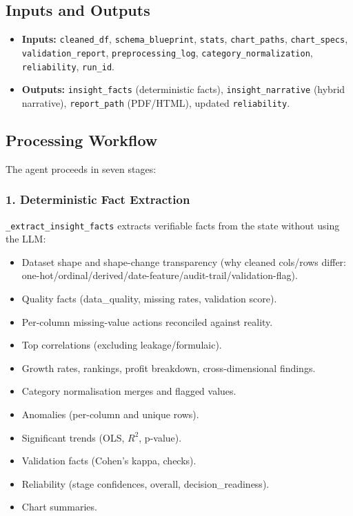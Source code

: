 \documentclass[12pt,a4paper,openany]{report}
\begin{document}
\subsection{Inputs and Outputs}
\begin{itemize}
	\item \textbf{Inputs:} \texttt{cleaned\_df}, \texttt{schema\_blueprint}, \texttt{stats}, \texttt{chart\_paths}, \texttt{chart\_specs}, \texttt{validation\_report}, \texttt{preprocessing\_log}, \texttt{category\_normalization}, \texttt{reliability}, \texttt{run\_id}.
	\item \textbf{Outputs:} \texttt{insight\_facts} (deterministic facts), \texttt{insight\_narrative} (hybrid narrative), \texttt{report\_path} (PDF/HTML), updated \texttt{reliability}.
\end{itemize}

\subsection{Processing Workflow}
The agent proceeds in seven stages:

\subsubsection{1. Deterministic Fact Extraction}
\texttt{\_extract\_insight\_facts} extracts verifiable facts from the state without using the LLM:
\begin{itemize}
	\item Dataset shape and shape-change transparency (why cleaned cols/rows differ: one-hot/ordinal/derived/date-feature/audit-trail/validation-flag).
	\item Quality facts (data\_quality, missing rates, validation score).
	\item Per-column missing-value actions reconciled against reality.
	\item Top correlations (excluding leakage/formulaic).
	\item Growth rates, rankings, profit breakdown, cross-dimensional findings.
	\item Category normalisation merges and flagged values.
	\item Anomalies (per-column and unique rows).
	\item Significant trends (OLS, $R^2$, p-value).
	\item Validation facts (Cohen's kappa, checks).
	\item Reliability (stage confidences, overall, decision\_readiness).
	\item Chart summaries.
\end{itemize}
\end{document}
